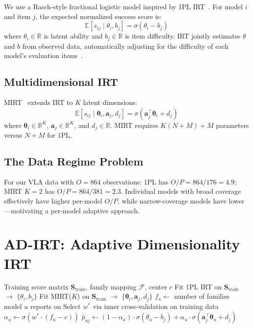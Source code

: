 \documentclass[11pt]{article}
\begin{document}
We use a Rasch-style fractional logistic model inspired by 1PL IRT~\citep{lord1968}. For model $i$ and item $j$, the expected normalized success score is:
\begin{equation}
\mathbb{E}[s_{ij} \mid \theta_i, b_j] = \sigma(\theta_i - b_j)
\label{eq:irt}
\end{equation}
where $\theta_i \in \mathbb{R}$ is latent ability and $b_j \in \mathbb{R}$ is item difficulty. IRT jointly estimates $\theta$ and $b$ from observed data, automatically adjusting for the difficulty of each model's evaluation items~\citep{kang2026efsl, rodriguez2021}.

\subsection{Multidimensional IRT}

MIRT~\citep{reckase2009} extends IRT to $K$ latent dimensions:
\begin{equation}
\mathbb{E}[s_{ij} \mid \boldsymbol{\theta}_i, \mathbf{a}_j, d_j] = \sigma(\mathbf{a}_j^\top \boldsymbol{\theta}_i + d_j)
\label{eq:mirt}
\end{equation}
where $\boldsymbol{\theta}_i \in \mathbb{R}^K$, $\mathbf{a}_j \in \mathbb{R}^K$, and $d_j \in \mathbb{R}$. MIRT requires $K(N + M) + M$ parameters versus $N + M$ for 1PL.

\subsection{The Data Regime Problem}

For our VLA data with $O = 864$ observations: 1PL has $O/P = 864/176 = 4.9$; MIRT $K\!=\!2$ has $O/P = 864/381 = 2.3$. Individual models with broad coverage effectively have higher per-model $O/P$, while narrow-coverage models have lower---motivating a per-model adaptive approach.

\section{AD-IRT: Adaptive Dimensionality IRT}

\begin{algorithm}[t]
\caption{AD-IRT: Adaptive Dimensionality IRT}
\begin{algorithmic}[1]
\REQUIRE Training score matrix $\mathbf{S}_{\mathrm{train}}$, family mapping $\mathcal{F}$, center $c$
\STATE Fit 1PL IRT on $\mathbf{S}_{\mathrm{train}}$ $\rightarrow$ $\{\theta_i, b_j\}$
\STATE Fit MIRT($K$) on $\mathbf{S}_{\mathrm{train}}$ $\rightarrow$ $\{\boldsymbol{\theta}_i, \mathbf{a}_j, d_j\}$
\STATE $f_u \leftarrow$ number of families model $u$ reports on
\STATE Select $w^*$ via inner cross-validation on training data
    \STATE $\alpha_u \leftarrow \sigma(w^* \cdot (f_u - c))$
    \STATE $\hat{p}_{uj} \leftarrow (1 - \alpha_u) \cdot \sigma(\theta_u - b_j) + \alpha_u \cdot \sigma(\mathbf{a}_j^\top \boldsymbol{\theta}_u + d_j)$
\ENDFOR
\end{algorithmic}
\end{algorithm}
\end{document}
